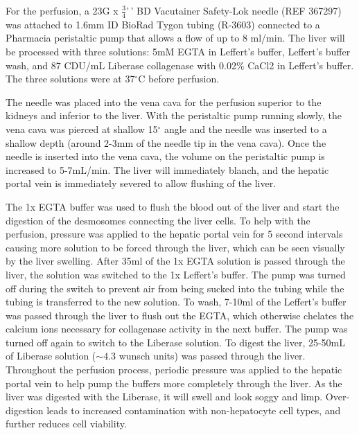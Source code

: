 \documentclass[10pt,letterpaper]{article}
\begin{document}
For the perfusion, a 23G x \(\frac{3}{4}\)'\,' BD Vacutainer Safety-Lok
needle (REF 367297) was attached to 1.6mm ID BioRad Tygon tubing
(R-3603) connected to a Pharmacia peristaltic pump that allows a flow of
up to 8 ml/min. The liver will be processed with three solutions: 5mM
EGTA in Leffert's buffer, Leffert's buffer wash, and 87 CDU/mL Liberase
collagenase with 0.02\% CaCl2 in Leffert's buffer. The three solutions
were at 37\(^{\circ}\)C before perfusion.

The needle was placed into the vena cava for the perfusion superior to
the kidneys and inferior to the liver. With the peristaltic pump running
slowly, the vena cava was pierced at shallow 15\(^{\circ}\) angle and
the needle was inserted to a shallow depth (around 2-3mm of the needle
tip in the vena cava). Once the needle is inserted into the vena cava,
the volume on the peristaltic pump is increased to 5-7mL/min. The liver
will immediately blanch, and the hepatic portal vein is immediately
severed to allow flushing of the liver.

The 1x EGTA buffer was used to flush the blood out of the liver and
start the digestion of the desmosomes connecting the liver cells. To
help with the perfusion, pressure was applied to the hepatic portal vein
for 5 second intervals causing more solution to be forced through the
liver, which can be seen visually by the liver swelling. After 35ml of
the 1x EGTA solution is passed through the liver, the solution was
switched to the 1x Leffert's buffer. The pump was turned off during the
switch to prevent air from being sucked into the tubing while the tubing
is transferred to the new solution. To wash, 7-10ml of the Leffert's
buffer was passed through the liver to flush out the EGTA, which
otherwise chelates the calcium ions necessary for collagenase activity
in the next buffer. The pump was turned off again to switch to the
Liberase solution. To digest the liver, 25-50mL of Liberase solution
(\(\sim4.3\) wunsch units) was passed through the liver. Throughout the
perfusion process, periodic pressure was applied to the hepatic portal
vein to help pump the buffers more completely through the liver. As the
liver was digested with the Liberase, it will swell and look soggy and
limp. Over-digestion leads to increased contamination with
non-hepatocyte cell types, and further reduces cell viability.
\end{document}
